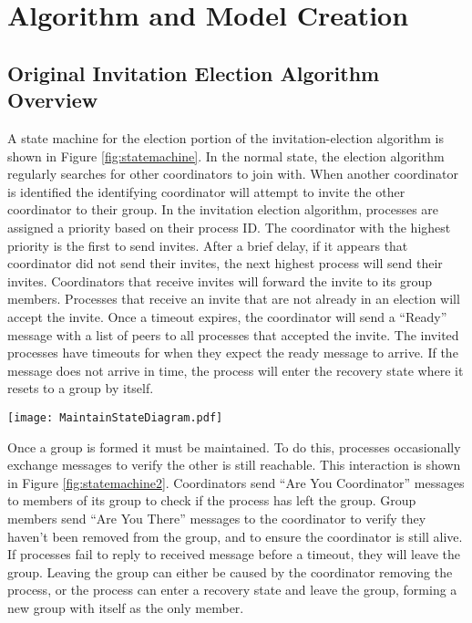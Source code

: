 \chapter{Algorithm and Model Creation}

\section{Original Invitation Election Algorithm Overview}

A state machine for the election portion of the invitation-election algorithm is shown in Figure \ref{fig:statemachine}.
In the normal state, the election algorithm regularly searches for other coordinators to join with.
When another coordinator is identified the identifying coordinator will attempt to invite the other coordinator to their group.
In the invitation election algorithm, processes are assigned a priority based on their process ID.
The coordinator with the highest priority is the first to send invites.
After a brief delay, if it appears that coordinator did not send their invites, the next highest process will send their invites.
Coordinators that receive invites will forward the invite to its group members.
Processes that receive an invite that are not already in an election will accept the invite.
Once a timeout expires, the coordinator will send a ``Ready'' message with a list of peers to all processes that accepted the invite.
The invited processes have timeouts for when they expect the ready message to arrive.
If the message does not arrive in time, the process will enter the recovery state where it resets to a group by itself.

\begin{figure*}[!t]
\texttt{[image: MaintainStateDiagram.pdf]}
\caption[State machine for maintaining a group]{State machine for maintaining a group. The \ac{AYC} messages are the same as those in Figure \ref{fig:statemachine}. \ac{AYC} and \ac{AYT} are periodically sent by processes, and responses to those messages are immediately sent by the receiving process. In the modified algorithm, the member does not enter the recovery state if they do not receive an AYT response before the timeout expires.}
\label{fig:statemachine2}
\end{figure*}

Once a group is formed it must be maintained.
To do this, processes occasionally exchange messages to verify the other is still reachable.
This interaction is shown in Figure \ref{fig:statemachine2}.
Coordinators send ``Are You Coordinator'' messages to members of its group to check if the process has left the group.
Group members send ``Are You There'' messages to the coordinator to verify they haven't been removed from the group, and to ensure the coordinator is still alive.
If processes fail to reply to received message before a timeout, they will leave the group.
Leaving the group can either be caused by the coordinator removing the process, or the process can enter a recovery state and leave the group, forming a new group with itself as the only member.

